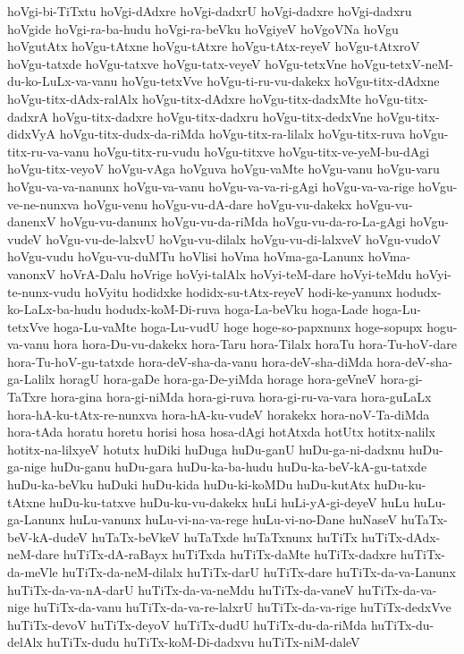 {hoVgi-bi-TiTxtu
hoVgi-dAdxre
hoVgi-dadxrU
hoVgi-dadxre
hoVgi-dadxru
hoVgide
hoVgi-ra-ba-hudu
hoVgi-ra-beVku
hoVgiyeV
hoVgoVNa
hoVgu
hoVgutAtx
hoVgu-tAtxne
hoVgu-tAtxre
hoVgu-tAtx-reyeV
hoVgu-tAtxroV
hoVgu-tatxde
hoVgu-tatxve
hoVgu-tatx-veyeV
hoVgu-tetxVne
hoVgu-tetxV-neM-du-ko-LuLx-va-vanu
hoVgu-tetxVve
hoVgu-ti-ru-vu-dakekx
hoVgu-titx-dAdxne
hoVgu-titx-dAdx-ralAlx
hoVgu-titx-dAdxre
hoVgu-titx-dadxMte
hoVgu-titx-dadxrA
hoVgu-titx-dadxre
hoVgu-titx-dadxru
hoVgu-titx-dedxVne
hoVgu-titx-didxVyA
hoVgu-titx-dudx-da-riMda
hoVgu-titx-ra-lilalx
hoVgu-titx-ruva
hoVgu-titx-ru-va-vanu
hoVgu-titx-ru-vudu
hoVgu-titxve
hoVgu-titx-ve-yeM-bu-dAgi
hoVgu-titx-veyoV
hoVgu-vAga
hoVguva
hoVgu-vaMte
hoVgu-vanu
hoVgu-varu
hoVgu-va-va-nanunx
hoVgu-va-vanu
hoVgu-va-va-ri-gAgi
hoVgu-va-va-rige
hoVgu-ve-ne-nunxva
hoVgu-venu
hoVgu-vu-dA-dare
hoVgu-vu-dakekx
hoVgu-vu-danenxV
hoVgu-vu-danunx
hoVgu-vu-da-riMda
hoVgu-vu-da-ro-La-gAgi
hoVgu-vudeV
hoVgu-vu-de-lalxvU
hoVgu-vu-dilalx
hoVgu-vu-di-lalxveV
hoVgu-vudoV
hoVgu-vudu
hoVgu-vu-duMTu
hoVlisi
hoVma
hoVma-ga-Lanunx
hoVma-vanonxV
hoVrA-Dalu
hoVrige
hoVyi-talAlx
hoVyi-teM-dare
hoVyi-teMdu
hoVyi-te-nunx-vudu
hoVyitu
hodidxke
hodidx-su-tAtx-reyeV
hodi-ke-yanunx
hodudx-ko-LaLx-ba-hudu
hodudx-koM-Di-ruva
hoga-La-beVku
hoga-Lade
hoga-Lu-tetxVve
hoga-Lu-vaMte
hoga-Lu-vudU
hoge
hoge-so-papxnunx
hoge-sopupx
hogu-va-vanu
hora
hora-Du-vu-dakekx
hora-Taru
hora-Tilalx
horaTu
hora-Tu-hoV-dare
hora-Tu-hoV-gu-tatxde
hora-deV-sha-da-vanu
hora-deV-sha-diMda
hora-deV-sha-ga-Lalilx
horagU
hora-gaDe
hora-ga-De-yiMda
horage
hora-geVneV
hora-gi-TaTxre
hora-gina
hora-gi-niMda
hora-gi-ruva
hora-gi-ru-va-vara
hora-guLaLx
hora-hA-ku-tAtx-re-nunxva
hora-hA-ku-vudeV
horakekx
hora-noV-Ta-diMda
hora-tAda
horatu
horetu
horisi
hosa
hosa-dAgi
hotAtxda
hotUtx
hotitx-nalilx
hotitx-na-lilxyeV
hotutx
huDiki
huDuga
huDu-ganU
huDu-ga-ni-dadxnu
huDu-ga-nige
huDu-ganu
huDu-gara
huDu-ka-ba-hudu
huDu-ka-beV-kA-gu-tatxde
huDu-ka-beVku
huDuki
huDu-kida
huDu-ki-koMDu
huDu-kutAtx
huDu-ku-tAtxne
huDu-ku-tatxve
huDu-ku-vu-dakekx
huLi
huLi-yA-gi-deyeV
huLu
huLu-ga-Lanunx
huLu-vanunx
huLu-vi-na-va-rege
huLu-vi-no-Dane
huNaseV
huTaTx-beV-kA-dudeV
huTaTx-beVkeV
huTaTxde
huTaTxnunx
huTiTx
huTiTx-dAdx-neM-dare
huTiTx-dA-raBayx
huTiTxda
huTiTx-daMte
huTiTx-dadxre
huTiTx-da-meVle
huTiTx-da-neM-dilalx
huTiTx-darU
huTiTx-dare
huTiTx-da-va-Lanunx
huTiTx-da-va-nA-darU
huTiTx-da-va-neMdu
huTiTx-da-vaneV
huTiTx-da-va-nige
huTiTx-da-vanu
huTiTx-da-va-re-lalxrU
huTiTx-da-va-rige
huTiTx-dedxVve
huTiTx-devoV
huTiTx-deyoV
huTiTx-dudU
huTiTx-du-da-riMda
huTiTx-du-delAlx
huTiTx-dudu
huTiTx-koM-Di-dadxvu
huTiTx-niM-daleV
}
